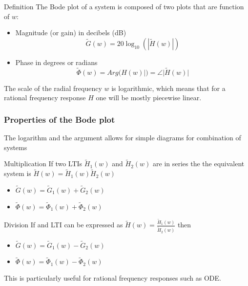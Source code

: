     \begin{block}{Definition}
      The Bode plot of a system is composed of two plots that are function of $w$:
      \begin{itemize}
        \item Magnitude (or gain) in decibels (dB)
        $$\tilde G(w)=20\log_{10}{(|\tilde H(w)|)}$$
        \item Phase in degrees or radians
        $$\tilde \Phi(w)=Arg(H(w)|)=\angle |\tilde H(w)|$$
      \end{itemize}
      The scale of the radial frequency $w$ is logarithmic, which means that for a rational frequency response $H$ one will be mostly piecewise linear.
    \end{block}
    
    \frametitle{Properties of the Bode plot}
    The logarithm and the argument allows for simple diagrams for combination of systems 
    \begin{block}{Multiplication}
      If two LTIs $\tilde H_1(w)$ and $\tilde H_2(w)$ are in series the  the equivalent system is  $\tilde H(w)=\tilde H_1(w)\tilde H_2(w)$ %
      \begin{itemize}
      \item $\tilde G(w)=\tilde G_1(w)+\tilde G_2(w)$
      \item  $\tilde \Phi(w)=\tilde \Phi_1(w)+\tilde \Phi_2(w)$
      \end{itemize}
  
    \end{block}
    \begin{block}{Division}
      If and LTI can be expressed as
   $\displaystyle \tilde H(w)=\frac{\tilde H_1(w)}{\tilde H_2(w)}$
  then%
      \begin{itemize}
      \item $\tilde G(w)=\tilde G_1(w)-\tilde G_2(w)$
      \item  $\tilde \Phi(w)=\tilde \Phi_1(w)-\tilde \Phi_2(w)$
      \end{itemize}
      This is particularly useful for rational frequency responses such as ODE.
    \end{block}

